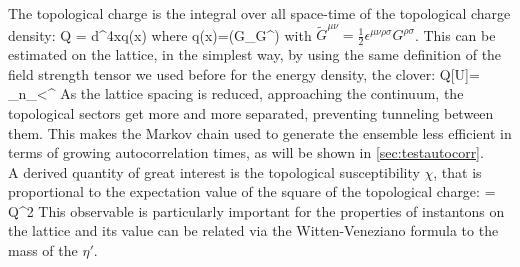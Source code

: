 The topological charge is the integral over all space-time of the topological charge density:
\beq
    Q = \int d^4xq(x)
\eeq
where
\beq 
    q(x)=\Tr(G_{\mu\nu}\tilde G^{\mu\nu}) 
\eeq 
with $\tilde G^{\mu\nu} = \frac{1}{2}\epsilon^{\mu\nu\rho\sigma} G^{\rho\sigma}$. This can be estimated on the lattice, in the simplest way, by using the same definition of the field strength tensor we used before for the energy density, the clover:
\beq
    Q[U]= \sum_{n\in\Lambda}\sum_{\mu<\nu}\epsilon^{\mu\nu\rho\sigma}
\eeq
As the lattice spacing is reduced, approaching the continuum, the topological sectors get more and more separated, preventing tunneling between them. This makes the Markov chain used to generate the ensemble less efficient in terms of growing autocorrelation times, as will be shown in \cref{sec:testautocorr}.\\
A derived quantity of great interest is the topological susceptibility $\chi$, that is proportional to the expectation value of the square of the topological charge:
\beq
    \chi = \langle Q^2 \rangle
\eeq
This observable is particularly important for the properties of instantons on the lattice and its value can be related via the Witten-Veneziano formula to the mass of the $\eta'$. \CIT

